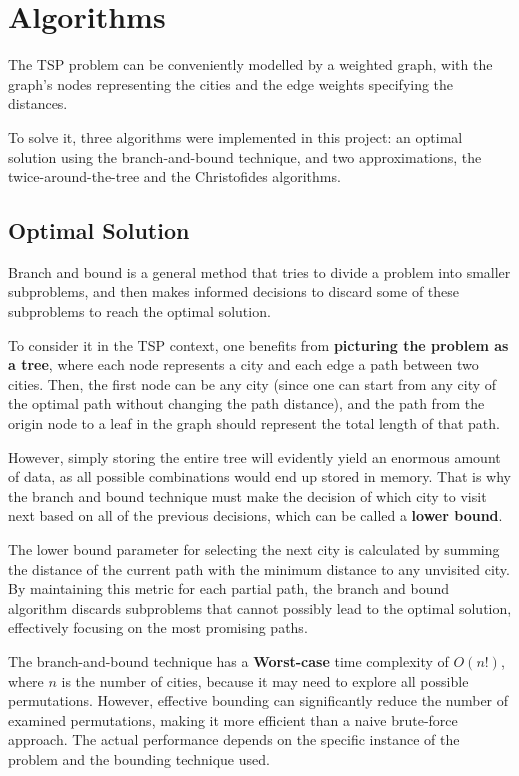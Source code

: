 \documentclass[12pt]{article}
\begin{document}
\section{Algorithms} \label{sec:algorithms}

The TSP problem can be conveniently modelled by a weighted graph, with the graph's 
nodes representing the cities and the edge weights specifying the distances.

To solve it, three algorithms were implemented in this project: an optimal solution using 
the branch-and-bound technique, and two approximations, the twice-around-the-tree and the 
Christofides algorithms.

\subsection{Optimal Solution} \label{sec:optimal_explanation}

Branch and bound is a general method that tries to divide a problem into smaller subproblems,
and then makes informed decisions to discard some of these subproblems to reach the optimal solution.

To consider it in the TSP context, one benefits from \textbf{picturing the problem as a tree}, where each node 
represents a city and each edge a path between two cities. Then, the first node can be any city 
(since one can start from any city of the optimal path without changing the path distance), and 
the path from the origin node to a leaf in the graph should represent the total 
length of that path.

However, simply storing the entire tree will evidently yield an enormous amount 
of data, as all possible combinations would end up stored in memory. That is why the 
branch and bound technique must make the decision of which city to visit next based 
on all of the previous decisions, which can be called a \textbf{lower bound}.

The lower bound parameter for selecting the next city is calculated by summing the 
distance of the current path with the minimum distance to any unvisited city. By 
maintaining this metric for each partial path, the branch and bound algorithm 
discards subproblems that cannot possibly lead to the optimal solution, effectively 
focusing on the most promising paths.

The branch-and-bound technique has a \textbf{Worst-case} time complexity of $O(n!)$, 
where $n$ is the number of cities, because it may need to explore all possible permutations. 
However, effective bounding can significantly reduce the number of examined permutations, 
making it more efficient than a naive brute-force approach. The actual performance depends on 
the specific instance of the problem and the bounding technique used.
\end{document}
